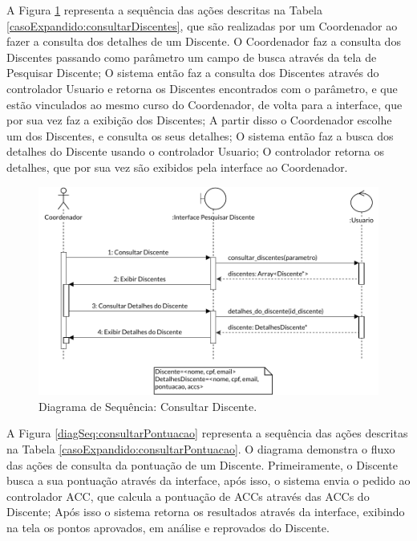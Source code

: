 A Figura \ref{diagSeq:consultarDiscente} representa a sequência das ações descritas na Tabela \ref{casoExpandido:consultarDiscentes}, que são realizadas por um Coordenador ao fazer a consulta dos detalhes de um Discente. O Coordenador faz a consulta dos Discentes passando como parâmetro um campo de busca através da tela de Pesquisar Discente; O sistema então faz a consulta dos Discentes através do controlador Usuario e retorna os Discentes encontrados com o parâmetro, e que estão vinculados ao mesmo curso do Coordenador, de volta para a interface, que por sua vez faz a exibição dos Discentes; A partir disso o Coordenador escolhe um dos Discentes, e consulta os seus detalhes; O sistema então faz a busca dos detalhes do Discente usando o controlador Usuario; O controlador retorna os detalhes, que por sua vez são exibidos pela interface ao Coordenador.

\begin{figure}[H]
    \centering
    \includegraphics[width=\textwidth]{dados/figuras/Proposta/DiagramasDeSequencia/Consultar Discente.pdf}
    \caption{Diagrama de Sequência: Consultar Discente.}
    \label{diagSeq:consultarDiscente}
\end{figure}


A Figura \ref{diagSeq:consultarPontuacao} representa a sequência das ações descritas na Tabela \ref{casoExpandido:consultarPontuacao}. O diagrama demonstra o fluxo das ações de consulta da pontuação de um Discente. Primeiramente, o Discente busca a sua pontuação através da interface, após isso, o sistema envia o pedido ao controlador ACC, que calcula a pontuação de ACCs através das ACCs do Discente; Após isso o sistema retorna os resultados através da interface, exibindo na tela os pontos aprovados, em análise e reprovados do Discente.

